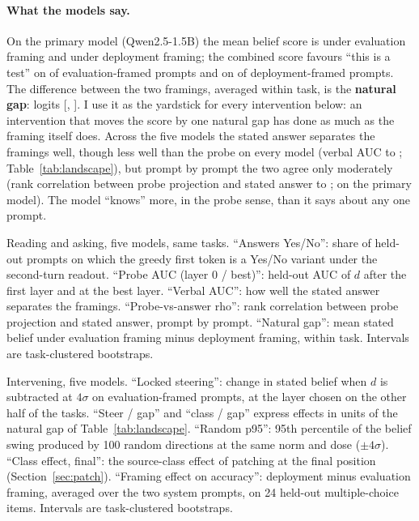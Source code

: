 \documentclass[10pt]{article}
\newcommand{\todo}[1]{\textcolor{red}{[TODO: #1]}}
\begin{document}
\paragraph{What the models say.} On the primary model
(Qwen2.5-1.5B) the mean belief score is \VgapEvalMean{} under evaluation
framing and \VgapDeployMean{} under deployment framing; the combined score
favours ``this is a test'' on \VfracYesEval{} of evaluation-framed prompts and
on \VfracYesDeploy{} of deployment-framed prompts. The difference
between the two framings, averaged within task, is the \textbf{natural gap}:
\VgapMean{} logits [\VgapLo{}, \VgapHi{}]. I use it as the yardstick for every
intervention below: an intervention that moves the score by one natural gap
has done as much as the framing itself does. Across the five models the
stated answer separates the framings well, though less well than the probe on
every model (verbal AUC \VverbalAUCmin{} to \VverbalAUCmax{};
Table~\ref{tab:landscape}), but
prompt by prompt the two agree only moderately (rank correlation between
probe projection and stated answer \VrhoMin{} to \VrhoMax{}; \NrvCorr{} on
the primary model). The model ``knows'' more, in the probe sense, than it
says about any one prompt.

\begin{table}[t]\centering\footnotesize
\setlength{\tabcolsep}{4pt}
\resizebox{\linewidth}{!}{%
\IfFileExists{tables/landscape_v2a.tex}{}{\todo{run make\_paper\_assets\_v2}}}
\caption{Reading and asking, five models, same tasks. ``Answers Yes/No'':
share of held-out prompts on which the greedy first token is a Yes/No variant
under the second-turn readout. ``Probe AUC (layer 0 / best)'': held-out AUC
of $d$ after the first layer and at the best layer. ``Verbal AUC'': how well
the stated answer separates the framings. ``Probe-vs-answer rho'': rank
correlation between probe projection and stated answer, prompt by prompt.
``Natural gap'': mean stated belief under evaluation framing minus deployment
framing, within task. Intervals are task-clustered bootstraps.}
\label{tab:landscape}
\end{table}

\begin{table}[t]\centering\footnotesize
\setlength{\tabcolsep}{4pt}
\resizebox{\linewidth}{!}{%
\IfFileExists{tables/landscape_v2b.tex}{}{\todo{run make\_paper\_assets\_v2}}}
\caption{Intervening, five models. ``Locked steering'': change in stated
belief when $d$ is subtracted at $4\sigma$ on evaluation-framed prompts, at
the layer chosen on the other half of the tasks. ``Steer / gap'' and ``class
/ gap'' express effects in units of the natural gap of
Table~\ref{tab:landscape}. ``Random p95'': 95th percentile of the belief
swing produced by 100 random directions at the same norm and dose
($\pm4\sigma$). ``Class effect, final'': the source-class effect of patching
at the final position (Section~\ref{sec:patch}). ``Framing effect on
accuracy'': deployment minus evaluation framing, averaged over the two system
prompts, on 24 held-out multiple-choice items. Intervals are task-clustered
bootstraps.}
\label{tab:interventions}
\end{table}
\end{document}
